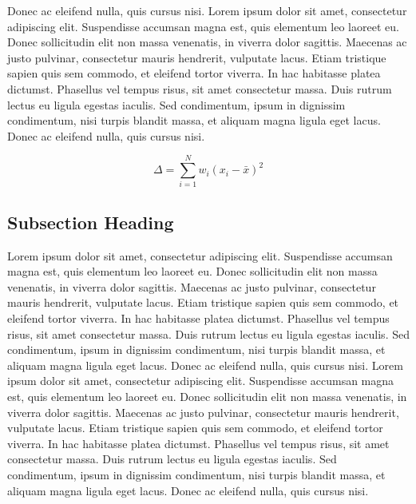 \documentclass{winnower}
\begin{document}
Donec ac eleifend nulla, quis cursus nisi. Lorem ipsum dolor sit amet, consectetur adipiscing elit. Suspendisse accumsan magna est, quis elementum leo laoreet eu. Donec sollicitudin elit non massa venenatis, in viverra dolor sagittis. Maecenas ac justo pulvinar, consectetur mauris hendrerit, vulputate lacus. Etiam tristique sapien quis sem commodo, et eleifend tortor viverra. In hac habitasse platea dictumst. Phasellus vel tempus risus, sit amet consectetur massa. Duis rutrum lectus eu ligula egestas iaculis. Sed condimentum, ipsum in dignissim condimentum, nisi turpis blandit massa, et aliquam magna ligula eget lacus. Donec ac eleifend nulla, quis cursus nisi.

\begin{equation}
\Delta =\sum_{i=1}^N w_i (x_i - \bar{x})^2 
\label{eqn:eq1}
\end{equation}

\subsection{Subsection Heading}

Lorem ipsum dolor sit amet, consectetur adipiscing elit. Suspendisse accumsan magna est, quis elementum leo laoreet eu. Donec sollicitudin elit non massa venenatis, in viverra dolor sagittis. Maecenas ac justo pulvinar, consectetur mauris hendrerit, vulputate lacus. Etiam tristique sapien quis sem commodo, et eleifend tortor viverra. In hac habitasse platea dictumst. Phasellus vel tempus risus, sit amet consectetur massa. Duis rutrum lectus eu ligula egestas iaculis. Sed condimentum, ipsum in dignissim condimentum, nisi turpis blandit massa, et aliquam magna ligula eget lacus. Donec ac eleifend nulla, quis cursus nisi. Lorem ipsum dolor sit amet, consectetur adipiscing elit. Suspendisse accumsan magna est, quis elementum leo laoreet eu. Donec sollicitudin elit non massa venenatis, in viverra dolor sagittis. Maecenas ac justo pulvinar, consectetur mauris hendrerit, vulputate lacus. Etiam tristique sapien quis sem commodo, et eleifend tortor viverra. In hac habitasse platea dictumst. Phasellus vel tempus risus, sit amet consectetur massa. Duis rutrum lectus eu ligula egestas iaculis. Sed condimentum, ipsum in dignissim condimentum, nisi turpis blandit massa, et aliquam magna ligula eget lacus. Donec ac eleifend nulla, quis cursus nisi.
\end{document}
